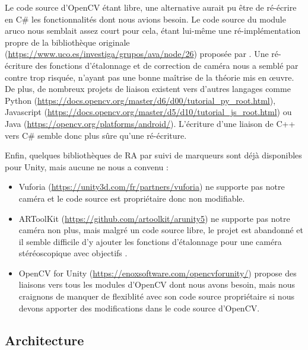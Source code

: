 Le code source d'OpenCV étant libre, une alternative aurait pu être de ré-écrire en C\# les fonctionnalités dont nous avions besoin. Le code source du module aruco nous semblait assez court pour cela, étant lui-même une ré-implémentation propre de la bibliothèque originale (\url{https://www.uco.es/investiga/grupos/ava/node/26}) proposée par \cite{Garrido-Jurado2014}. Une ré-écriture des fonctions d'étalonnage et de correction de caméra nous a semblé par contre trop risquée, n'ayant pas une bonne maîtrise de la théorie mis en \oe uvre. De plus, de nombreux projets de liaison existent vers d'autres langages comme Python (\url{https://docs.opencv.org/master/d6/d00/tutorial_py_root.html}), Javascript (\url{https://docs.opencv.org/master/d5/d10/tutorial_js_root.html}) ou Java (\url{https://opencv.org/platforms/android/}). L'écriture d'une liaison de C++ vers C\# semble donc plus sûre qu'une ré-écriture.

Enfin, quelques bibliothèques de RA par suivi de marqueurs sont déjà disponibles pour Unity, mais aucune ne nous a convenu :
\begin{itemize}
  \item Vuforia (\url{https://unity3d.com/fr/partners/vuforia}) ne supporte pas notre caméra et le code source est propriétaire donc non modifiable.
  \item ARToolKit (\url{https://github.com/artoolkit/arunity5}) ne supporte pas notre caméra non plus, mais malgré un code source libre, le projet est abandonné et il semble difficile d'y ajouter les fonctions d'étalonnage pour une caméra stéréoscopique avec objectifs .
  \item OpenCV for Unity (\url{https://enoxsoftware.com/opencvforunity/}) propose des liaisons vers tous les modules d'OpenCV dont nous avons besoin, mais nous craignons de manquer de flexiblité avec son code source propriétaire si nous devons apporter des modifications dans le code source d'OpenCV.
\end{itemize}

\subsection{Architecture}
\label{subsec:aruco_unity_architecture}

